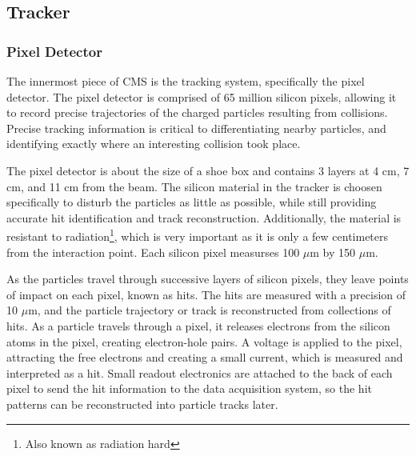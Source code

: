 \subsection{Tracker}
\subsubsection{Pixel Detector}
The innermost piece of CMS is the tracking system, specifically the pixel detector. The pixel detector is comprised of 65 million silicon pixels, allowing it to record
precise trajectories of the charged particles resulting from collisions. Precise tracking information is critical to differentiating nearby particles, and identifying
exactly where an interesting collision took place. 

The pixel detector is about the size of a shoe box and contains 3 layers at 4 cm, 7 cm, and 11 cm from the beam.
The silicon material in the tracker is choosen specifically to disturb the particles as little as possible, while still providing accurate hit identification and track reconstruction.
Additionally, the material is resistant to radiation\footnote{Also known as radiation hard}, which is very important as it is only a few centimeters from the interaction point. Each silicon pixel measurses 100 $\mu$m by 150 $\mu$m. 

As the particles travel through successive layers of silicon pixels, they leave points of impact on each pixel, known as hits.
The hits are measured with a precision of 10 $\mu$m, and the particle trajectory or track is reconstructed from collections of hits. 
As a particle travels through a pixel, it releases electrons from the silicon atoms in the pixel, creating electron-hole pairs.
A voltage is applied to the pixel, attracting the free electrons and creating a small current, which is measured and interpreted as a hit. Small readout electronics
are attached to the back of each pixel to send the hit information to the data acquisition system, so the hit patterns can be reconstructed into particle tracks later.   

